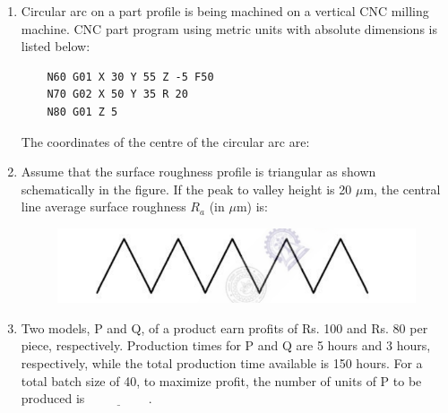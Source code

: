 \documentclass[journal]{IEEEtran}
\begin{document}
\begin{enumerate}[leftmargin=0pt]
    \item Circular arc on a part profile is being machined on a vertical CNC milling machine. CNC part program using metric units with absolute dimensions is listed below:
    \begin{verbatim}
    N60 G01 X 30 Y 55 Z -5 F50
    N70 G02 X 50 Y 35 R 20
    N80 G01 Z 5
    \end{verbatim}
    The coordinates of the centre of the circular arc are:
    \begin{enumerate}
    \end{enumerate}

    \item Assume that the surface roughness profile is triangular as shown schematically in the figure. If the peak to valley height is 20 $\mu$m, the central line average surface roughness $R_a$ (in $\mu$m) is:
    \begin{figure}[h]
    \centering
    \includegraphics[width=0.5\columnwidth]{Figs/image (30).png}
    \caption*{}
    \label{fig:50}
    \end{figure}
    \begin{enumerate}
    \end{enumerate}

    \item Two models, P and Q, of a product earn profits of Rs. 100 and Rs. 80 per piece, respectively. Production times for P and Q are 5 hours and 3 hours, respectively, while the total production time available is 150 hours. For a total batch size of 40, to maximize profit, the number of units of P to be produced is $\underline{\hspace{2cm}}$.


\end{enumerate}
\end{document}

